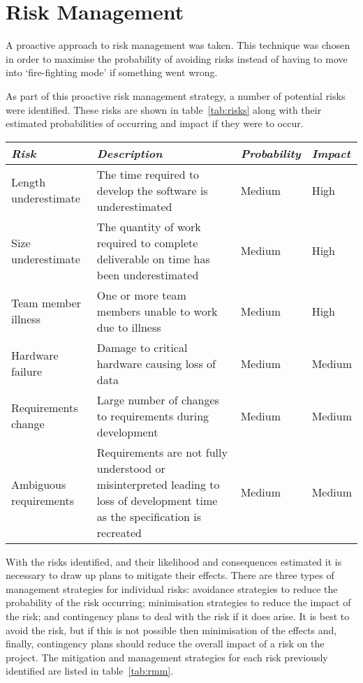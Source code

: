\section{Risk Management}
\label{sec:risk}
 
A proactive approach to risk management was taken. This technique was chosen in order
to maximise the probability of avoiding risks instead of having to move into `fire-fighting mode'
if something went wrong.
 
As part of this proactive risk management strategy, a number of potential risks were identified.
These risks are shown in table~\ref{tab:risks} along with their estimated probabilities of occurring
and impact if they were to occur.
 
\begin{table*}
	\small
	\begin{tabular}{l p{} l l}
		\toprule
		\emph{Risk} & \emph{Description} & \emph{Probability} & \emph{Impact} \\
		\midrule
		Length underestimate & The time required to develop the software is underestimated & Medium & High \\
		Size underestimate & The quantity of work required to complete deliverable on time has been underestimated & Medium & High \\
		Team member illness & One or more team members unable to work due to illness & Medium & High \\
		Hardware failure & Damage to critical hardware causing loss of data & Medium & Medium \\
		Requirements change & Large number of changes to requirements during development & Medium & Medium \\
		Ambiguous requirements & Requirements are not fully understood or misinterpreted leading to
			loss of development time as the specification is recreated & Medium & Medium \\
		\bottomrule
	\end{tabular}
	\vspace{1.5em}
	\caption[Risk identification and analysis]{Risk identification and analysis.}
	\label{tab:risks}
\end{table*}
 
With the risks identified, and their likelihood and consequences estimated it is necessary
to draw up plans to mitigate their effects. There are three types of management strategies 
for individual risks: avoidance strategies to reduce the probability of the risk occurring;
minimisation strategies to reduce the impact of the risk; and contingency plans to deal with
the risk if it does arise. It is best to avoid the risk,
but if this is not possible then minimisation of the effects and, finally, contingency plans
should reduce the overall impact of a risk on the project. The mitigation and management
strategies for each risk previously identified are listed in table~\ref{tab:rmm}.
 

